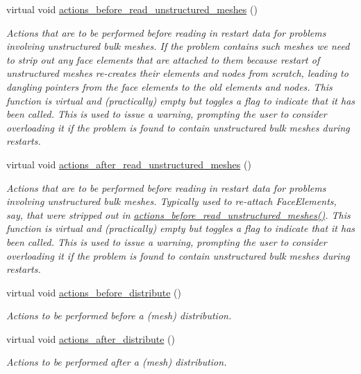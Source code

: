 \begin{DoxyCompactItemize}
virtual void \hyperlink{classoomph_1_1Problem_af10662119a7a0c3a47879fa0d0644452}{actions\+\_\+before\+\_\+read\+\_\+unstructured\+\_\+meshes} ()
\begin{DoxyCompactList}\small\item\em Actions that are to be performed before reading in restart data for problems involving unstructured bulk meshes. If the problem contains such meshes we need to strip out any face elements that are attached to them because restart of unstructured meshes re-\/creates their elements and nodes from scratch, leading to dangling pointers from the face elements to the old elements and nodes. This function is virtual and (practically) empty but toggles a flag to indicate that it has been called. This is used to issue a warning, prompting the user to consider overloading it if the problem is found to contain unstructured bulk meshes during restarts. \end{DoxyCompactList}\item 
virtual void \hyperlink{classoomph_1_1Problem_a498317b3e390eddf2169ab989ee8d6b4}{actions\+\_\+after\+\_\+read\+\_\+unstructured\+\_\+meshes} ()
\begin{DoxyCompactList}\small\item\em Actions that are to be performed before reading in restart data for problems involving unstructured bulk meshes. Typically used to re-\/attach Face\+Elements, say, that were stripped out in \hyperlink{classoomph_1_1Problem_af10662119a7a0c3a47879fa0d0644452}{actions\+\_\+before\+\_\+read\+\_\+unstructured\+\_\+meshes()}. This function is virtual and (practically) empty but toggles a flag to indicate that it has been called. This is used to issue a warning, prompting the user to consider overloading it if the problem is found to contain unstructured bulk meshes during restarts. \end{DoxyCompactList}\item 
virtual void \hyperlink{classoomph_1_1Problem_a1d1280f442f9352a614bada21324456d}{actions\+\_\+before\+\_\+distribute} ()
\begin{DoxyCompactList}\small\item\em Actions to be performed before a (mesh) distribution. \end{DoxyCompactList}\item 
virtual void \hyperlink{classoomph_1_1Problem_a4d3e3bd312518ca5afef94e169f81c39}{actions\+\_\+after\+\_\+distribute} ()
\begin{DoxyCompactList}\small\item\em Actions to be performed after a (mesh) distribution. \end{DoxyCompactList}\item 

\end{DoxyCompactItemize}
